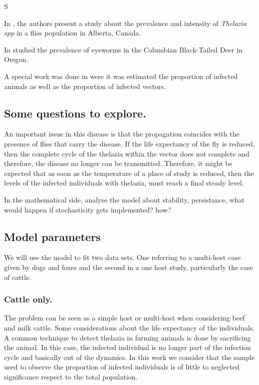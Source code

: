 S\documentclass[preprint,12pt]{elsarticle}
\begin{document}
\noindent In \cite{Ohara:1989}, the authors present a study about the prevalence and intensity of \textit{Thelazia spp} in a flies population in Alberta, Canada.


In \cite{Beitel:1974} studied the prevalence of eyeworms in the Columbian Black-Tailed Deer in Oregon. 

A special work was done in \cite{Moolenbeek:1980} were it was estimated the proportion of infected animals as well as the proportion of infected vectors.

\subsection{Some questions to explore.}
\noindent An important issue in this disease is that the propagation coincides with the presence of flies that carry the disease. If the life expectancy of the fly is reduced, then
the complete cycle of the thelazia within the vector does not complete and therefore, the 
disease no longer can be transmitted. Therefore, it might be expected that as soon as the temperature of a place of study is reduced, then the levels of the infected individuals 
with thelazia, must reach a final steady level.

\noindent In the mathematical side, analyse the model about stability, persistance, what would happen if stochasticity gets implemented? how?

\subsection{Model parameters}


\noindent We will use the model to fit two data sets. One referring to a multi-host case given by dogs and foxes and the second in a one host study, particularly the case of cattle.

\subsubsection{Cattle only.}
\noindent The problem can be seen as a simple host or multi-host when considering beef and milk cattle.
\noindent Some considerations about the life expectancy of the individuals. A common technique 
to detect thelazia in farming animals is done by sacrificing the animal. In this case, the infected individual is no longer part of the infection cycle and basically out of the dynamics.
In this work we consider that the sample used to observe the proportion of infected individuals is of little to neglected significance respect to the total population.
\end{document}
